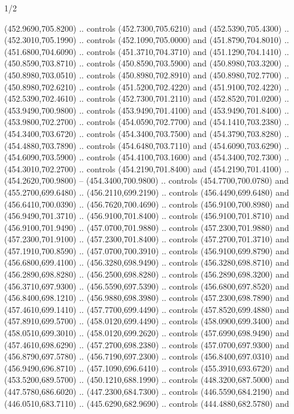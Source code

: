 \begin{flagdescription}{1/2}
\begin{scope}[xshift=0.5\flaglength]
\begin{scope}[scale=0.00745\flagwidth,xshift=-12.1mm,yshift=41.7mm]
\begin{scope}[y=0.80pt, x=0.80pt, yscale=-1, xscale=1, inner sep=0pt, outer sep=0pt]
\begin{scope}[cm={{1.33333,0.0,0.0,-1.33333,(0.0,114.66667)}}]
\begin{scope}[scale=0.100]
  (452.9690,705.8200) .. controls (452.7300,705.6210) and (452.5390,705.4300) ..
  (452.3010,705.1990) .. controls (452.1090,705.0000) and (451.8790,704.8010) ..
  (451.6800,704.6090) .. controls (451.3710,704.3710) and (451.1290,704.1410) ..
  (450.8590,703.8710) .. controls (450.8590,703.5900) and (450.8980,703.3200) ..
  (450.8980,703.0510) .. controls (450.8980,702.8910) and (450.8980,702.7700) ..
  (450.8980,702.6210) .. controls (451.5200,702.4220) and (451.9100,702.4220) ..
  (452.5390,702.4610) .. controls (452.7300,701.2110) and (452.8520,701.0200) ..
  (453.9490,700.9800) .. controls (453.9490,701.4100) and (453.9490,701.8400) ..
  (453.9800,702.2700) .. controls (454.0590,702.7700) and (454.1410,703.2380) ..
  (454.3400,703.6720) .. controls (454.3400,703.7500) and (454.3790,703.8280) ..
  (454.4880,703.7890) .. controls (454.6480,703.7110) and (454.6090,703.6290) ..
  (454.6090,703.5900) .. controls (454.4100,703.1600) and (454.3400,702.7300) ..
  (454.3010,702.2700) .. controls (454.2190,701.8400) and (454.2190,701.4100) ..
  (454.2620,700.9800) -- (454.3400,700.9800) .. controls (454.7700,700.0780) and
  (455.2700,699.6480) .. (456.2110,699.2190) .. controls (456.4490,699.6480) and
  (456.6410,700.0390) .. (456.7620,700.4690) .. controls (456.9100,700.8980) and
  (456.9490,701.3710) .. (456.9100,701.8400) .. controls (456.9100,701.8710) and
  (456.9100,701.9490) .. (457.0700,701.9880) .. controls (457.2300,701.9880) and
  (457.2300,701.9100) .. (457.2300,701.8400) .. controls (457.2700,701.3710) and
  (457.1910,700.8590) .. (457.0700,700.3910) .. controls (456.9100,699.8790) and
  (456.6800,699.4100) .. (456.3280,698.9490) .. controls (456.3280,698.8710) and
  (456.2890,698.8280) .. (456.2500,698.8280) .. controls (456.2890,698.3200) and
  (456.3710,697.9300) .. (456.5590,697.5390) .. controls (456.6800,697.8520) and
  (456.8400,698.1210) .. (456.9880,698.3980) .. controls (457.2300,698.7890) and
  (457.4610,699.1410) .. (457.7700,699.4490) .. controls (457.8520,699.4880) and
  (457.8910,699.5700) .. (458.0120,699.4490) .. controls (458.0900,699.3400) and
  (458.0510,699.3010) .. (458.0120,699.2620) .. controls (457.6990,698.9490) and
  (457.4610,698.6290) .. (457.2700,698.2380) .. controls (457.0700,697.9300) and
  (456.8790,697.5780) .. (456.7190,697.2300) .. controls (456.8400,697.0310) and
  (456.9490,696.8710) .. (457.1090,696.6410) .. controls (455.3910,693.6720) and
  (453.5200,689.5700) .. (450.1210,688.1990) .. controls (448.3200,687.5000) and
  (447.5780,686.6020) .. (447.2300,684.7300) .. controls (446.5590,684.2190) and
  (446.0510,683.7110) .. (445.6290,682.9690) .. controls (444.4880,682.5780) and

\end{scope}
\end{scope}
\end{scope}
\end{scope}
\end{scope}
\end{flagdescription}
